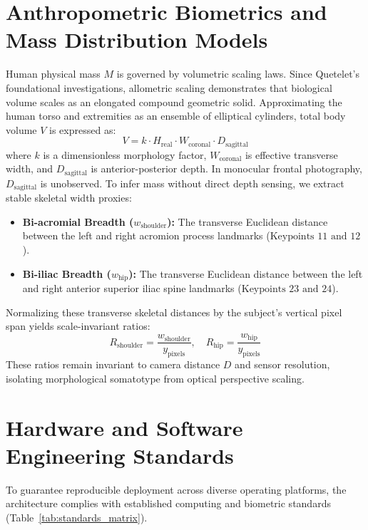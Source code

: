 \documentclass[12pt,a4paper,oneside]{report}
\begin{document}
\section{Anthropometric Biometrics and Mass Distribution Models}
Human physical mass $M$ is governed by volumetric scaling laws. Since Quetelet's foundational investigations, allometric scaling demonstrates that biological volume scales as an elongated compound geometric solid. Approximating the human torso and extremities as an ensemble of elliptical cylinders, total body volume $V$ is expressed as:
\begin{equation}
V = k \cdot H_{\text{real}} \cdot W_{\text{coronal}} \cdot D_{\text{sagittal}}
\end{equation}
where $k$ is a dimensionless morphology factor, $W_{\text{coronal}}$ is effective transverse width, and $D_{\text{sagittal}}$ is anterior-posterior depth. In monocular frontal photography, $D_{\text{sagittal}}$ is unobserved. To infer mass without direct depth sensing, we extract stable skeletal width proxies:
\begin{itemize}
    \item \textbf{Bi-acromial Breadth ($w_{\text{shoulder}}$):} The transverse Euclidean distance between the left and right acromion process landmarks ($\text{Keypoints } 11 \text{ and } 12$).
    \item \textbf{Bi-iliac Breadth ($w_{\text{hip}}$):} The transverse Euclidean distance between the left and right anterior superior iliac spine landmarks ($\text{Keypoints } 23 \text{ and } 24$).
\end{itemize}
Normalizing these transverse skeletal distances by the subject's vertical pixel span yields scale-invariant ratios:
\begin{equation}
R_{\text{shoulder}} = \frac{w_{\text{shoulder}}}{y_{\text{pixels}}}, \quad R_{\text{hip}} = \frac{w_{\text{hip}}}{y_{\text{pixels}}}
\end{equation}
These ratios remain invariant to camera distance $D$ and sensor resolution, isolating morphological somatotype from optical perspective scaling.

\section{Hardware and Software Engineering Standards}
To guarantee reproducible deployment across diverse operating platforms, the architecture complies with established computing and biometric standards (Table~\ref{tab:standards_matrix}).
\end{document}
